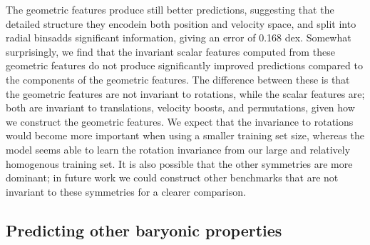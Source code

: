 The geometric features produce still better predictions, suggesting that the detailed structure they encode{\emdash}in both position and velocity space, and split into radial bins{\emdash}adds significant information, giving an error of 0.168 dex.
Somewhat surprisingly, we find that the invariant scalar features computed from these geometric features do not produce significantly improved predictions compared to the components of the geometric features.
The difference between these is that the geometric features are not invariant to rotations, while the scalar features are; both are invariant to translations, velocity boosts, and permutations, given how we construct the geometric features.
We expect that the invariance to rotations would become more important when using a smaller training set size, whereas the model seems able to learn the rotation invariance from our large and relatively homogenous training set.
It is also possible that the other symmetries are more dominant; in future work we could construct other benchmarks that are not invariant to these symmetries for a clearer comparison.


\subsection{Predicting other baryonic properties}
\label{sec:pred_galprops}

